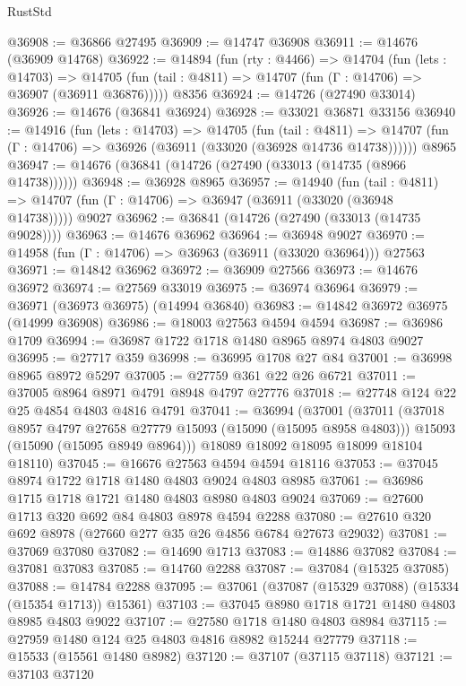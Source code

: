 \begin{lexlean}{RustStd}
\begin{coremodule}
@36908 := @36866 @27495
@36909 := @14747 @36908
@36911 := @14676 (@36909 @14768)
@36922 := @14894
    (fun (rty : @4466) =>
    @14704
      (fun (lets : @14703) =>
      @14705 (fun (tail : @4811) => @14707 (fun (Γ : @14706) => @36907 (@36911 @36876)))))
    @8356
@36924 := @14726 (@27490 @33014)
@36926 := @14676 (@36841 @36924)
@36928 := @33021 @36871 @33156
@36940 := @14916
    (fun (lets : @14703) =>
    @14705
      (fun (tail : @4811) =>
      @14707 (fun (Γ : @14706) => @36926 (@36911 (@33020 (@36928 @14736 @14738))))))
    @8965
@36947 := @14676 (@36841 (@14726 (@27490 (@33013 (@14735 (@8966 @14738))))))
@36948 := @36928 @8965
@36957 := @14940
    (fun (tail : @4811) => @14707 (fun (Γ : @14706) => @36947 (@36911 (@33020 (@36948 @14738)))))
    @9027
@36962 := @36841 (@14726 (@27490 (@33013 (@14735 @9028))))
@36963 := @14676 @36962
@36964 := @36948 @9027
@36970 := @14958 (fun (Γ : @14706) => @36963 (@36911 (@33020 @36964))) @27563
@36971 := @14842 @36962
@36972 := @36909 @27566
@36973 := @14676 @36972
@36974 := @27569 @33019
@36975 := @36974 @36964
@36979 := @36971 (@36973 @36975) (@14994 @36840)
@36983 := @14842 @36972 @36975 (@14999 @36908)
@36986 := @18003 @27563 @4594 @4594
@36987 := @36986 @1709
@36994 := @36987 @1722 @1718 @1480 @8965 @8974 @4803 @9027
@36995 := @27717 @359
@36998 := @36995 @1708 @27 @84
@37001 := @36998 @8965 @8972 @5297
@37005 := @27759 @361 @22 @26 @6721
@37011 := @37005 @8964 @8971 @4791 @8948 @4797 @27776
@37018 := @27748 @124 @22 @25 @4854 @4803 @4816 @4791
@37041 := @36994
    (@37001
      (@37011
        (@37018 @8957 @4797 @27658 @27779 @15093 (@15090 (@15095 @8958 @4803)))
        @15093
        (@15090 (@15095 @8949 @8964)))
      @18089
      @18092
      @18095
      @18099
      @18104
      @18110)
@37045 := @16676 @27563 @4594 @4594 @18116
@37053 := @37045 @8974 @1722 @1718 @1480 @4803 @9024 @4803 @8985
@37061 := @36986 @1715 @1718 @1721 @1480 @4803 @8980 @4803 @9024
@37069 := @27600 @1713 @320 @692 @84 @4803 @8978 @4594 @2288
@37080 := @27610 @320 @692 @8978 (@27660 @277 @35 @26 @4856 @6784 @27673 @29032)
@37081 := @37069 @37080
@37082 := @14690 @1713
@37083 := @14886 @37082
@37084 := @37081 @37083
@37085 := @14760 @2288
@37087 := @37084 (@15325 @37085)
@37088 := @14784 @2288
@37095 := @37061 (@37087 (@15329 @37088) (@15334 (@15354 @1713)) @15361)
@37103 := @37045 @8980 @1718 @1721 @1480 @4803 @8985 @4803 @9022
@37107 := @27580 @1718 @1480 @4803 @8984
@37115 := @27959 @1480 @124 @25 @4803 @4816 @8982 @15244 @27779
@37118 := @15533 (@15561 @1480 @8982)
@37120 := @37107 (@37115 @37118)
@37121 := @37103 @37120

\end{coremodule}
\end{lexlean}
